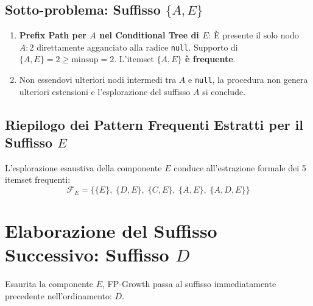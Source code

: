 \FloatBarrier
\subsection{Sotto-problema: Suffisso $\{A, E\}$}
\begin{enumerate}
    \item \textbf{Prefix Path per $A$ nel Conditional Tree di $E$}:
    È presente il solo nodo $A:2$ direttamente agganciato alla radice \texttt{null}.
    Supporto di $\{A, E\} = 2 \ge \text{minsup} = 2$. L'itemset \textbf{$\{A, E\}$ è frequente}.
    \item Non essendovi ulteriori nodi intermedi tra $A$ e \texttt{null}, la procedura non genera ulteriori estensioni e l'esplorazione del suffisso $A$ si conclude.
\end{enumerate}

\FloatBarrier
\subsection{Riepilogo dei Pattern Frequenti Estratti per il Suffisso $E$}
L'esplorazione esaustiva della componente $E$ conduce all'estrazione formale dei 5 itemset frequenti:
\begin{equation}
\mathcal{F}_E = \big\{ \{E\}, \; \{D, E\}, \; \{C, E\}, \; \{A, E\}, \; \{A, D, E\} \big\}
\end{equation}

\FloatBarrier
\section{Elaborazione del Suffisso Successivo: Suffisso \texorpdfstring{$D$}{D}}
\label{sec:dm-fp-execution-trace-d}

Esaurita la componente $E$, FP-Growth passa al suffisso immediatamente precedente nell'ordinamento: \textbf{$D$}.

